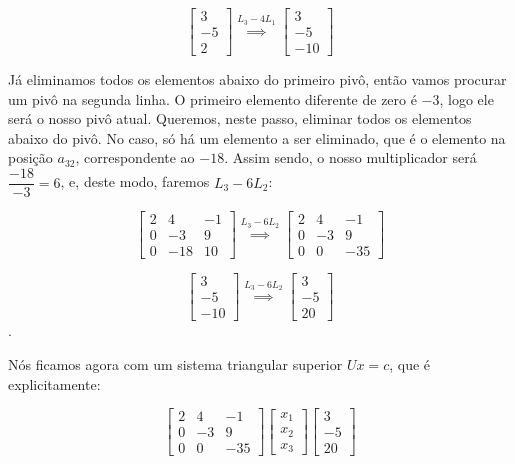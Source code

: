 \begin{Example}
	$$
	\begin{bmatrix}
		3 \\
		-5 \\
		2
	\end{bmatrix} \overset{L_3 - 4L_1}{\implies} \begin{bmatrix}
		3 \\
		-5 \\
		-10
	\end{bmatrix}
	$$
	
	Já eliminamos todos os elementos abaixo do primeiro pivô, então vamos procurar um pivô na segunda linha. O primeiro elemento diferente de zero é $-3$, logo ele será o nosso pivô atual. Queremos, neste passo, eliminar todos os elementos abaixo do pivô. No caso, só há um elemento a ser eliminado, que é o elemento na posição $a_{32}$, correspondente ao $-18$. Assim sendo, o nosso multiplicador será $\dfrac{-18}{-3} = 6$, e, deste modo, faremos $L_3 - 6L_2$:
	
	$$
	\begin{bmatrix}
		2 & 4 & -1 \\
		0 & -3 & 9 \\
		0 & -18 & 10
	\end{bmatrix} \overset{L_3 - 6L_2}{\implies} \begin{bmatrix}
		2 & 4 & -1 \\
		0 & -3 & 9 \\
		0 & 0 & -35
	\end{bmatrix}
	$$
	
	$$
	\begin{bmatrix}
		3 \\
		-5 \\
		-10
	\end{bmatrix} \overset{L_3 - 6L_2}{\implies} \begin{bmatrix}
		3 \\
		-5 \\
		20
	\end{bmatrix}
	$$.
	
	Nós ficamos agora com um sistema triangular superior $Ux = c$, que é explicitamente:
	
	$$
	\begin{bmatrix}
		2 & 4 & -1 \\
		0 & -3 & 9 \\
		0 & 0 & -35
	\end{bmatrix}
	\begin{bmatrix}
		x_1 \\
		x_2 \\
		x_3
	\end{bmatrix}
	\begin{bmatrix}
		3 \\
		-5 \\
		20
	\end{bmatrix}
	$$
	

\end{Example}
